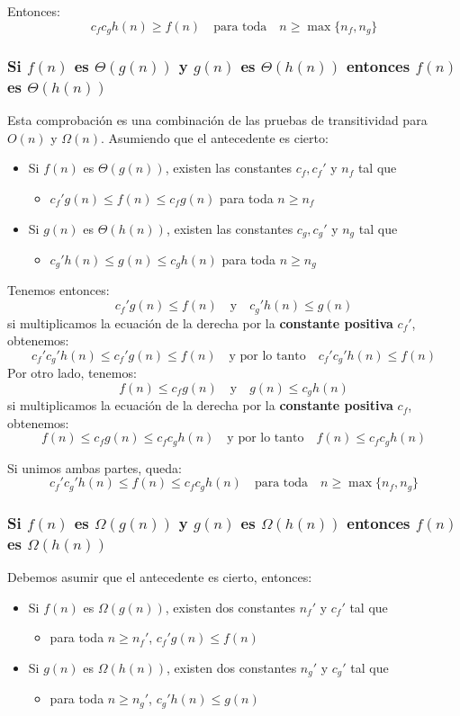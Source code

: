 \documentclass[letterpaper]{article}
\begin{document}
\noindent
Entonces:
$$
c_f c_g h(n) \geq f(n) \quad \mbox{para toda} \quad n \geq \max\{n_f, n_g\}
$$
\subsubsection{Si \(f(n)\) es \(\Theta(g(n))\) y \(g(n)\) es \(\Theta(h(n))\) entonces \(f(n)\) es \(\Theta(h(n))\)}
\label{sec:org588fd80}
Esta comprobación es una combinación de las pruebas de transitividad para \(O(n)\)
y \(\Omega(n)\). Asumiendo que el antecedente es cierto:
\begin{itemize}
\item Si \(f(n)\) es \(\Theta(g(n))\), existen las constantes \(c_f, c_f'\) y \(n_f\) tal que
\begin{itemize}
\item \(c_f' g(n) \leq f(n) \leq c_f g(n)\) para toda \(n \geq n_f\)
\end{itemize}
\item Si \(g(n)\) es \(\Theta(h(n))\), existen las constantes \(c_g, c_g'\) y \(n_g\) tal que
\begin{itemize}
\item \(c_g' h(n) \leq g(n) \leq c_g h(n)\) para toda \(n \geq n_g\)
\end{itemize}
\end{itemize}
\parg
Tenemos entonces:
$$
c_f' g(n) \leq f(n) \quad \mbox{y} \quad c_g' h(n) \leq g(n)
$$
si multiplicamos la ecuación de la derecha por la \textbf{constante positiva} \(c_f'\),
obtenemos:
$$
c_f' c_g' h(n) \leq c_f' g(n) \leq f(n) \quad \mbox{y por lo tanto} \quad
c_f' c_g' h(n) \leq f(n)
$$
\parg
\noindent
Por otro lado, tenemos:
$$
f(n) \leq  c_f g(n) \quad \mbox{y} \quad g(n) \leq c_g h(n)
$$
si multiplicamos la ecuación de la derecha por la \textbf{constante positiva} \(c_f\),
obtenemos:
$$
f(n) \leq c_f g(n) \leq c_f c_g h(n) \quad \mbox{y por lo tanto} \quad
f(n) \leq c_f c_g h(n)
$$
\parg

\noindent
Si unimos ambas partes, queda:
$$
c_f' c_g' h(n) \leq f(n) \leq c_f c_g h(n) \quad \mbox{para toda} \quad
n \geq \max\{n_f, n_g\}
$$
\subsubsection{Si \(f(n)\) es \(\Omega(g(n))\) y \(g(n)\) es \(\Omega(h(n))\) entonces \(f(n)\) es \(\Omega(h(n))\)}
\label{sec:org169c466}
Debemos asumir que el antecedente es cierto, entonces:
\begin{itemize}
\item Si \(f(n)\) es \(\Omega(g(n))\), existen dos constantes \(n_f'\) y \(c_f'\) tal que
\begin{itemize}
\item para toda \(n \geq n_f'\), \(c_f' g(n) \leq f(n)\)
\end{itemize}
\item Si \(g(n)\) es \(\Omega(h(n))\), existen dos constantes \(n_g'\) y \(c_g'\) tal que
\begin{itemize}
\item para toda \(n \geq n_g'\), \(c_g' h(n) \leq g(n)\)
\end{itemize}
\end{itemize}
\end{document}
